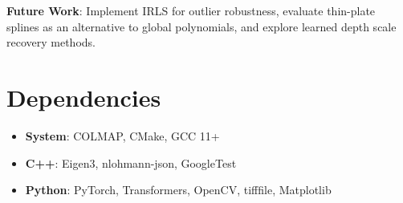 \documentclass[11pt,a4paper]{article}
\begin{document}
\textbf{Future Work}: Implement IRLS for outlier robustness, evaluate thin-plate splines as an alternative to global polynomials, and explore learned depth scale recovery methods.

\section*{Dependencies}

\begin{itemize}[noitemsep]
    \item \textbf{System}: COLMAP, CMake, GCC 11+
    \item \textbf{C++}: Eigen3, nlohmann-json, GoogleTest
    \item \textbf{Python}: PyTorch, Transformers, OpenCV, tifffile, Matplotlib
\end{itemize}
\end{document}

